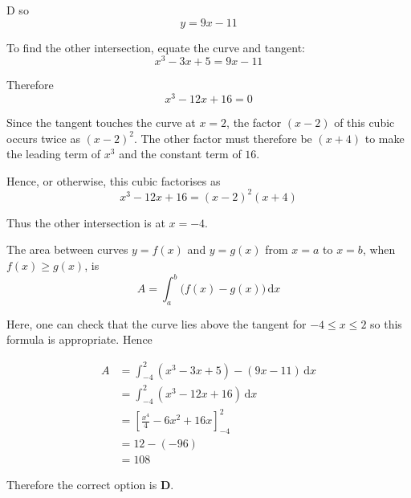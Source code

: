\documentclass[11pt,a4paper]{article}
\begin{document}
\begin{enumerate}[label=\textbf{\arabic*.},leftmargin=*,itemsep=0pt,start=5]
\begin{djsSolution}{D}
so
\[
y=9x-11
\]

To find the other intersection, equate the curve and tangent:
\[
x^3-3x+5=9x-11
\]

Therefore
\[
x^3-12x+16=0
\]

Since the tangent touches the curve at $x=2$, the factor $(x-2)$ of this cubic occurs twice as $(x-2)^2$. The other factor must therefore be $(x+4)$ to make the leading term of $x^3$ and the constant term of $16$.

Hence, or otherwise, this cubic factorises as
\[
x^3-12x+16=(x-2)^2(x+4)
\]

Thus the other intersection is at $x=-4$.

The area between curves $y=f(x)$ and $y=g(x)$ from $x=a$ to $x=b$, when $f(x)\geq g(x)$, is
\[
A=\int_a^b \bigl(f(x)-g(x)\bigr)\,\mathrm{d}x
\]

Here, one can check that the curve lies above the tangent for $-4\leq x\leq2$ so this formula is appropriate. Hence

\begin{align*}
A &=\int_{-4}^{2}(x^3-3x+5)-(9x-11)\,\mathrm{d}x\\[5pt]
&=\int_{-4}^{2}(x^3-12x+16)\,\mathrm{d}x\\[5pt]
&=\left[\frac{x^4}{4}-6x^2+16x\right]_{-4}^{2}\\[5pt] 
&=12-(-96)\\[5pt]
&=108
\end{align*}

Therefore the correct option is \textbf{D}.
\end{djsSolution}
\end{enumerate}
\clearpage
\thispagestyle{djssolutions}
\vspace*{8pt}
\end{document}
